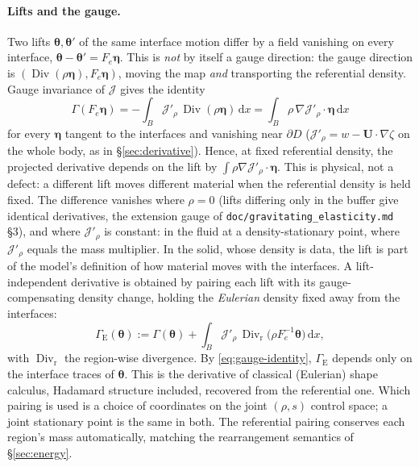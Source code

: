 \documentclass[11pt]{article}
\newcommand{\Jf}{\mathscr{J}}  %
\newcommand{\bU}{\mathbf{U}}
\newcommand{\bfeta}{\bm{\eta}}
\newcommand{\dx}{\,\mathrm{d}x}
\newcommand{\Div}{\operatorname{Div}}
\begin{document}
\paragraph{Lifts and the gauge.} Two lifts $\bm{\theta}, \bm{\theta}'$ of
the same interface motion differ by a field vanishing on every interface,
$\bm{\theta} - \bm{\theta}' = F_e\bfeta$. This is \emph{not} by itself a
gauge direction: the gauge direction is $(\Div(\rho\bfeta), F_e\bfeta)$,
moving the map \emph{and} transporting the referential density.
Gauge invariance of $\Jf $ gives the identity
\begin{equation}
  \Gamma(F_e\bfeta) = -\int_B \Jf'_\rho\,\Div(\rho\bfeta)\dx
  = \int_B \rho\,\nabla \Jf'_\rho\cdot\bfeta\dx
  \label{eq:gauge-identity}
\end{equation}
for every $\bfeta$ tangent to the interfaces and vanishing near
$\partial D$ ($\Jf'_\rho = w - \bU\cdot\nabla\zeta$ on the whole body, as in
\S\ref{sec:derivative}). Hence, at fixed referential density, the
projected derivative depends on the lift by
$\int\rho\nabla \Jf'_\rho\cdot\bfeta$. This is physical, not a defect: a
different lift moves different material when the referential density is
held fixed. The difference vanishes where $\rho = 0$ (lifts differing
only in the buffer give identical derivatives, the extension gauge of
\texttt{doc/gravitating\_elasticity.md} \S3), and where $\Jf'_\rho$ is
constant: in the fluid at a density-stationary point, where $\Jf'_\rho$
equals the mass multiplier. In the solid, whose density is data, the lift
is part of the model's definition of how material moves with the
interfaces. A lift-independent derivative is obtained by pairing each
lift with its gauge-compensating density change, holding the
\emph{Eulerian} density fixed away from the interfaces:
\begin{equation}
  \Gamma_{\mathrm{E}}(\bm{\theta}) := \Gamma(\bm{\theta})
  + \int_B \Jf'_\rho\,\Div_{\mathrm{r}}\bigl(\rho F_e^{-1}\bm{\theta}\bigr)\dx ,
\end{equation}
with $\Div_{\mathrm{r}}$ the region-wise divergence. By
\eqref{eq:gauge-identity}, $\Gamma_{\mathrm{E}}$ depends only on the
interface traces of $\bm{\theta}$. This is the derivative of classical
(Eulerian) shape calculus, Hadamard structure included, recovered from
the referential one. Which pairing is used is a choice of coordinates on
the joint $(\rho, s)$ control space; a joint stationary point is the same
in both. The referential pairing conserves each region's mass
automatically, matching the rearrangement semantics of
\S\ref{sec:energy}.
\end{document}
